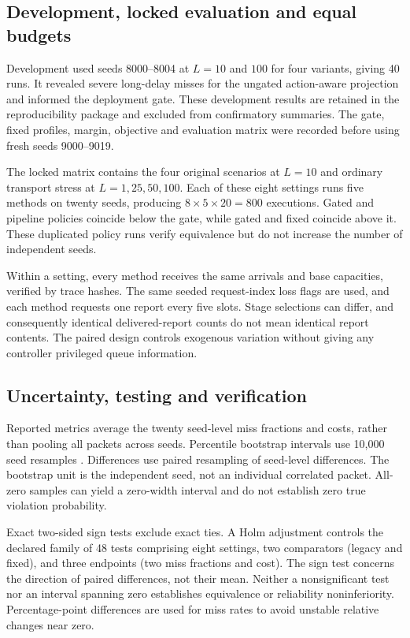 \documentclass[10pt,a4paper]{article}
\begin{document}
\subsection{Development, locked evaluation and equal budgets}
Development used seeds 8000--8004 at $L=10$ and $100$ for four variants, giving
40 runs. It revealed severe long-delay misses for the ungated action-aware
projection and informed the deployment gate. These development results are
retained in the reproducibility package and excluded from confirmatory summaries.
The gate, fixed profiles, margin, objective and evaluation matrix were recorded
before using fresh seeds 9000--9019.

The locked matrix contains the four original scenarios at $L=10$ and ordinary
transport stress at $L=1,25,50,100$. Each of these eight settings runs five
methods on twenty seeds, producing $8\times5\times20=800$ executions. Gated
and pipeline policies coincide below the gate, while gated and fixed coincide
above it. These duplicated policy runs verify equivalence but do not increase
the number of independent seeds.

Within a setting, every method receives the same arrivals and base capacities,
verified by trace hashes. The same seeded request-index loss flags are used,
and each method requests one report every five slots. Stage selections can
differ, and consequently identical delivered-report counts do not mean identical
report contents. The paired design controls exogenous variation without giving
any controller privileged queue information.

\subsection{Uncertainty, testing and verification}
Reported metrics average the twenty seed-level miss fractions and costs, rather
than pooling all packets across seeds. Percentile bootstrap intervals use 10,000
seed resamples \cite{efron}. Differences use paired resampling of seed-level
differences. The bootstrap unit is the independent seed, not an individual
correlated packet. All-zero samples can yield a zero-width interval and do not
establish zero true violation probability.

Exact two-sided sign tests exclude exact ties. A Holm adjustment \cite{holm}
controls the declared family of 48 tests comprising eight settings, two
comparators (legacy and fixed), and three endpoints (two miss fractions and
cost). The sign test concerns the direction of paired differences, not their
mean. Neither a nonsignificant test nor an interval spanning zero establishes
equivalence or reliability noninferiority. Percentage-point differences are
used for miss rates to avoid unstable relative changes near zero.
\end{document}
